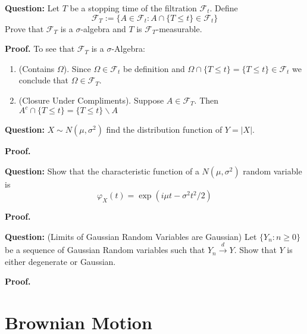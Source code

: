 \documentclass{article}
\begin{document}
\begin{tcolorbox}[colframe=black,colback=gray!5,boxrule=0.5pt]
\textbf{Question:} Let $T$ be a stopping time of the filtration $\mathcal{F}_t$. Define 
$$\mathcal{F}_T := \{A\in\mathcal{F}_t : A\cap\{T\leq t\}\in\mathcal{F}_t\}$$
Prove that $\mathcal{F}_T$ is a $\sigma$-algebra and $T$ is $\mathcal{F}_T$-measurable.
\end{tcolorbox}
\textbf{Proof.} To see that $\mathcal{F}_T$ is a $\sigma$-Algebra: 
\begin{enumerate}
    \item (Contains $\Omega$). Since $\Omega\in\mathcal{F}_t$ be definition and $\Omega \cap\{T\leq t\} = \{T\leq t\}\in\mathcal{F}_t$ we conclude that $\Omega\in\mathcal{F}_T$. 
    \item (Closure Under Compliments). Suppose $A\in\mathcal{F}_T$. Then $A^c\cap\{T\leq t\} = \{T\leq t\}\backslash A $
\end{enumerate}

\begin{tcolorbox}[colframe=black,colback=gray!5,boxrule=0.5pt]
\textbf{Question:} $X\sim N(\mu,\sigma^2)$ find the distribution function of $Y = |X|.$
\end{tcolorbox}
\textbf{Proof.}


\begin{tcolorbox}[colframe=black,colback=gray!5,boxrule=0.5pt]
\textbf{Question:} Show that the characteristic function of a $N(\mu, \sigma^2)$ random variable is 
$$\varphi_X(t) = \exp(i\mu t - \sigma^2t^2/2)$$
\end{tcolorbox}
\textbf{Proof.}


\begin{tcolorbox}[colframe=black,colback=gray!5,boxrule=0.5pt]
\textbf{Question:} (Limits of Gaussian Random Variables are Gaussian) Let $\{Y_n:n\geq 0\}$ be a sequence of Gaussian Random variables such that $Y_n\stackrel{d}{\to} Y$. Show that $Y$ is either degenerate or Gaussian. 
\end{tcolorbox}
\textbf{Proof.}

\newpage
\section{Brownian Motion}
\end{document}
